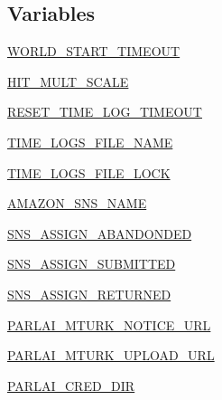 \subsection*{Variables}
\begin{DoxyCompactItemize}
\item 
\hyperlink{namespaceparlai_1_1mturk_1_1core_1_1mturk__manager_a0b48ab114df6c40bcd9a468efb2f02ad}{W\+O\+R\+L\+D\+\_\+\+S\+T\+A\+R\+T\+\_\+\+T\+I\+M\+E\+O\+UT}
\item 
\hyperlink{namespaceparlai_1_1mturk_1_1core_1_1mturk__manager_a82efdcc451840583a12e216e872592ff}{H\+I\+T\+\_\+\+M\+U\+L\+T\+\_\+\+S\+C\+A\+LE}
\item 
\hyperlink{namespaceparlai_1_1mturk_1_1core_1_1mturk__manager_ad2d9d517fba4c58b0c55721c92b228e0}{R\+E\+S\+E\+T\+\_\+\+T\+I\+M\+E\+\_\+\+L\+O\+G\+\_\+\+T\+I\+M\+E\+O\+UT}
\item 
\hyperlink{namespaceparlai_1_1mturk_1_1core_1_1mturk__manager_a147ccb3f0483680bada691257c7f53fc}{T\+I\+M\+E\+\_\+\+L\+O\+G\+S\+\_\+\+F\+I\+L\+E\+\_\+\+N\+A\+ME}
\item 
\hyperlink{namespaceparlai_1_1mturk_1_1core_1_1mturk__manager_a1f861d064a3ab6a560eeb1e13d5becb5}{T\+I\+M\+E\+\_\+\+L\+O\+G\+S\+\_\+\+F\+I\+L\+E\+\_\+\+L\+O\+CK}
\item 
\hyperlink{namespaceparlai_1_1mturk_1_1core_1_1mturk__manager_a69d3be15a2f448684bdbefe4b873f938}{A\+M\+A\+Z\+O\+N\+\_\+\+S\+N\+S\+\_\+\+N\+A\+ME}
\item 
\hyperlink{namespaceparlai_1_1mturk_1_1core_1_1mturk__manager_ac1f22ff5ca889c430bc6825cc2436e4d}{S\+N\+S\+\_\+\+A\+S\+S\+I\+G\+N\+\_\+\+A\+B\+A\+N\+D\+O\+N\+D\+ED}
\item 
\hyperlink{namespaceparlai_1_1mturk_1_1core_1_1mturk__manager_a796b9ab167b88bc97737e129790784a0}{S\+N\+S\+\_\+\+A\+S\+S\+I\+G\+N\+\_\+\+S\+U\+B\+M\+I\+T\+T\+ED}
\item 
\hyperlink{namespaceparlai_1_1mturk_1_1core_1_1mturk__manager_acd67aa95d50ad81a5d5ccae543fcb165}{S\+N\+S\+\_\+\+A\+S\+S\+I\+G\+N\+\_\+\+R\+E\+T\+U\+R\+N\+ED}
\item 
\hyperlink{namespaceparlai_1_1mturk_1_1core_1_1mturk__manager_a117dc23798d96c639a4e1b3593b51ba5}{P\+A\+R\+L\+A\+I\+\_\+\+M\+T\+U\+R\+K\+\_\+\+N\+O\+T\+I\+C\+E\+\_\+\+U\+RL}
\item 
\hyperlink{namespaceparlai_1_1mturk_1_1core_1_1mturk__manager_a915333d6c0d1c24cfe8a57eadf00ffba}{P\+A\+R\+L\+A\+I\+\_\+\+M\+T\+U\+R\+K\+\_\+\+U\+P\+L\+O\+A\+D\+\_\+\+U\+RL}
\item 
\hyperlink{namespaceparlai_1_1mturk_1_1core_1_1mturk__manager_a0c255e208aff054203bf9b327f85c052}{P\+A\+R\+L\+A\+I\+\_\+\+C\+R\+E\+D\+\_\+\+D\+IR}

\end{DoxyCompactItemize}

